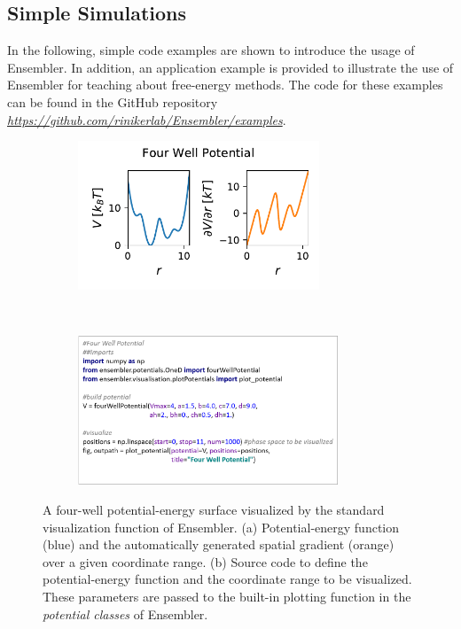 \subsection{Simple Simulations}
In the following, simple code examples are shown to introduce the usage of Ensembler. In addition, an application example is provided to illustrate the use of Ensembler for teaching about free-energy methods. 
The code for these examples can be found in the GitHub repository \textit{\hyperlink{https://github.com/rinikerlab/Ensembler}{https://github.com/rinikerlab/Ensembler/examples}}.
\begin{figure}[h!]
	\centering
	\begin{subfigure}{0.85\textwidth}
		\includegraphics[width=\linewidth, height=1.75in]{fig/codeExamples/four_well.pdf} 
		\caption{}
	\end{subfigure}\\
	\begin{subfigure}{0.85\textwidth}
		\includegraphics[width=\linewidth, height=1.75in]{fig/codeExamples/Potential_code.png}
		\caption{}
	\end{subfigure}
	\caption{A four-well potential-energy surface visualized by the standard visualization function of Ensembler. (a) Potential-energy function (blue) and the automatically generated spatial gradient (orange) over a given coordinate range. (b) Source code to define the potential-energy function and the coordinate range to be visualized. These parameters are passed to the built-in plotting function in the \textit{potential classes} of Ensembler.}
	\label{fig:code_example_potential}
\end{figure}

